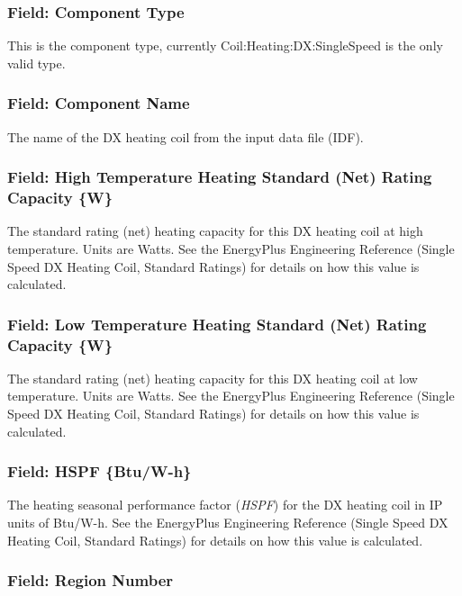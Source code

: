 \subsubsection{Field: Component Type}\label{field-component-type-5}

This is the component type, currently Coil:Heating:DX:SingleSpeed is the only valid type.

\subsubsection{Field: Component Name}\label{field-component-name-5}

The name of the DX heating coil from the input data file (IDF).

\subsubsection{Field: High Temperature Heating Standard (Net) Rating Capacity \{W\}}\label{field-high-temperature-heating-standard-net-rating-capacity-w}

The standard rating (net) heating capacity for this DX heating coil at high temperature. Units are Watts. See the EnergyPlus Engineering Reference (Single Speed DX Heating Coil, Standard Ratings) for details on how this value is calculated.

\subsubsection{Field: Low Temperature Heating Standard (Net) Rating Capacity \{W\}}\label{field-low-temperature-heating-standard-net-rating-capacity-w}

The standard rating (net) heating capacity for this DX heating coil at low temperature. Units are Watts. See the EnergyPlus Engineering Reference (Single Speed DX Heating Coil, Standard Ratings) for details on how this value is calculated.

\subsubsection{Field: HSPF \{Btu/W-h\}}\label{field-hspf-btuw-h}

The heating seasonal performance factor (\emph{HSPF}) for the DX heating coil in IP units of Btu/W-h. See the EnergyPlus Engineering Reference (Single Speed DX Heating Coil, Standard Ratings) for details on how this value is calculated.

\subsubsection{Field: Region Number}\label{field-region-number}

